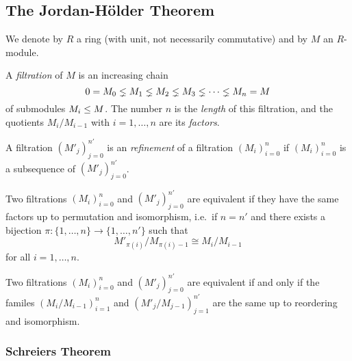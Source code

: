\subsection{The Jordan-Hölder Theorem}
\label{appendix: jordan hoelder}


\begin{conventions}
  We denote by $R$ a ring (with unit, not necessarily commutative) and by $M$ an $R$-module.
\end{conventions}


\begin{definition}
  \label{definition: filtration}
  A \emph{filtration} of $M$ is an increasing chain
  \[
                0
    =           M_0
    \lneq  M_1
    \lneq  M_2
    \lneq  M_3
    \lneq  \dotsb
    \lneq  M_n
    =           M
  \]
  of submodules $M_i \leq M$.
  The number $n$ is the \emph{length} of this filtration, and the quotients $M_i/M_{i-1}$ with $i = 1, \dotsc, n$ are its \emph{factors}.
\end{definition}


\begin{definition}
  A filtration $(M'_j)_{j=0}^{n'}$ is an \emph{refinement} of a filtration $(M_i)_{i=0}^n$ if $(M_i)_{i=0}^n$ is a subsequence of $(M'_j)_{j=0}^{n'}$.
\end{definition}


\begin{definition}
  Two filtrations $(M_i)_{i=0}^n$ and $(M'_j)_{j=0}^{n'}$ are equivalent if they have the same factors up to permutation and isomorphism, i.e.\ if $n = n'$ and there exists a bijection $\pi \colon \{1, \dotsc, n\} \to \{1, \dotsc, n'\}$ such that
  \[
          M'_{\pi(i)} / M_{\pi(i)-1}
    \cong M_i / M_{i-1}
  \]
  for all $i = 1, \dotsc, n$.
\end{definition}


\begin{remark}
  Two filtrations $(M_i)_{i=0}^n$ and $(M'_j)_{j=0}^{n'}$ are equivalent if and only if the familes $(M_i/M_{i-1})_{i=1}^n$ and $(M'_j/M_{j-1})_{j=1}^{n'}$ are the same up to reordering and isomorphism.
\end{remark}







\subsubsection{Schreiers Theorem}


